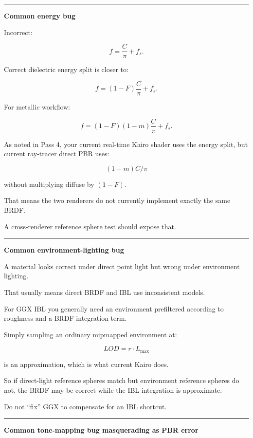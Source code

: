 \begin{center}\rule{0.5\linewidth}{0.5pt}\end{center}

\textbf{Common energy bug}

Incorrect:

\[
f=
\frac{C}{\pi}
+
f_s.
\]

Correct dielectric energy split is closer to:

\[
f=
(1-F)
\frac{C}{\pi}
+
f_s.
\]

For metallic workflow:

\[
f=
(1-F)(1-m)
\frac{C}{\pi}
+
f_s.
\]

As noted in Pass 4, your current real-time Kairo shader uses the energy split, but current ray-tracer direct PBR uses:

\[
(1-m)C/\pi
\]

without multiplying diffuse by \((1-F)\).

That means the two renderers do not currently implement exactly the same BRDF.

A cross-renderer reference sphere test should expose that.

\begin{center}\rule{0.5\linewidth}{0.5pt}\end{center}

\textbf{Common environment-lighting bug}

A material looks correct under direct point light but wrong under environment lighting.

That usually means direct BRDF and IBL use inconsistent models.

For GGX IBL you generally need an environment prefiltered according to roughness and a BRDF integration term.

Simply sampling an ordinary mipmapped environment at:

\[
LOD=r\cdot L_{\max}
\]

is an approximation, which is what current Kairo does.

So if direct-light reference spheres match but environment reference spheres do not, the BRDF may be correct while the IBL integration is approximate.

Do not ``fix'' GGX to compensate for an IBL shortcut.

\begin{center}\rule{0.5\linewidth}{0.5pt}\end{center}

\textbf{Common tone-mapping bug masquerading as PBR error}

